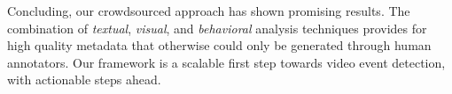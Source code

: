 \documentclass[runningheads,a4paper]{llncs}
\begin{document}
 Concluding, our crowdsourced approach has shown promising results. The combination of \emph{textual}, \emph{visual}, and \emph{behavioral} analysis techniques provides for high quality metadata that otherwise could only be generated through human annotators. Our framework is a scalable first step towards video event detection, with actionable steps ahead.

\renewcommand{\ttdefault}{cmvtt}
\renewcommand\UrlFont\tt



\end{document}
